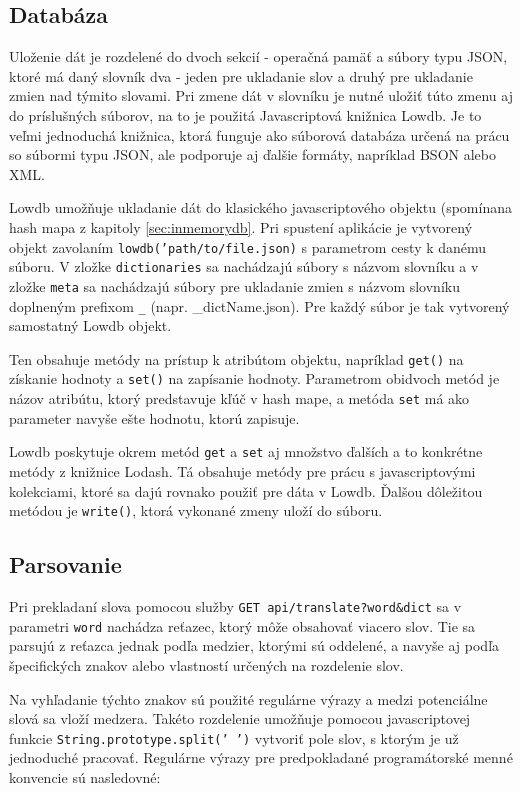 \documentclass[
  digital, %
  table,   %
  lof,     %
  lot,     %
]{fithesis3}
\begin{document}
\subsection{Databáza}
Uloženie dát je rozdelené do dvoch sekcií - operačná pamäť a súbory typu JSON, ktoré má daný slovník dva - jeden pre ukladanie slov a druhý pre ukladanie zmien nad týmito slovami. Pri zmene dát v slovníku je nutné uložiť túto zmenu aj do príslušných súborov, na to je použitá Javascriptová knižnica Lowdb. Je to veľmi jednoduchá knižnica, ktorá funguje ako súborová databáza určená na prácu so súbormi typu JSON, ale podporuje aj ďalšie formáty, napríklad BSON alebo XML.

Lowdb umožňuje ukladanie dát do klasického javascriptového objektu (spomínana hash mapa z kapitoly \ref{sec:inmemorydb}. Pri spustení aplikácie je vytvorený objekt zavolaním \texttt{lowdb('path/to/file.json)} s parametrom cesty k danému súboru. V zložke \texttt{dictionaries} sa nachádzajú súbory s názvom slovníku a v zložke \texttt{meta} sa nachádzajú súbory pre ukladanie zmien s názvom slovníku doplneným prefixom \texttt{\_} (napr. \_dictName.json). Pre každý súbor je tak vytvorený samostatný Lowdb objekt.

Ten obsahuje metódy na prístup k atribútom objektu, napríklad \texttt{get()} na získanie hodnoty a \texttt{set()} na zapísanie hodnoty. Parametrom obidvoch metód je názov atribútu, ktorý predstavuje kľúč v hash mape, a metóda \texttt{set} má ako parameter navyše ešte hodnotu, ktorú zapisuje.

Lowdb poskytuje okrem metód \texttt{get} a \texttt{set} aj množstvo ďalších a to konkrétne metódy z knižnice Lodash. Tá obsahuje metódy pre prácu s javascriptovými kolekciami, ktoré sa dajú rovnako použiť pre dáta v Lowdb. Ďalšou dôležitou metódou je \texttt{write()}, ktorá vykonané zmeny uloží do súboru.

\subsection{Parsovanie}
Pri prekladaní slova pomocou služby \texttt{GET api/translate?word\&dict} sa v parametri \texttt{word} nachádza reťazec, ktorý môže obsahovať viacero slov. Tie sa parsujú z reťazca jednak podľa medzier, ktorými sú oddelené, a navyše aj podľa špecifických znakov alebo vlastností určených na rozdelenie slov.

Na vyhľadanie týchto znakov sú použité regulárne výrazy a medzi potenciálne slová sa vloží medzera. Takéto rozdelenie umožňuje pomocou javascriptovej funkcie \texttt{String.prototype.split(' ')} vytvoriť pole slov, s ktorým je už jednoduché pracovať. Regulárne výrazy pre predpokladané programátorské menné konvencie sú nasledovné:
\\
\end{document}
